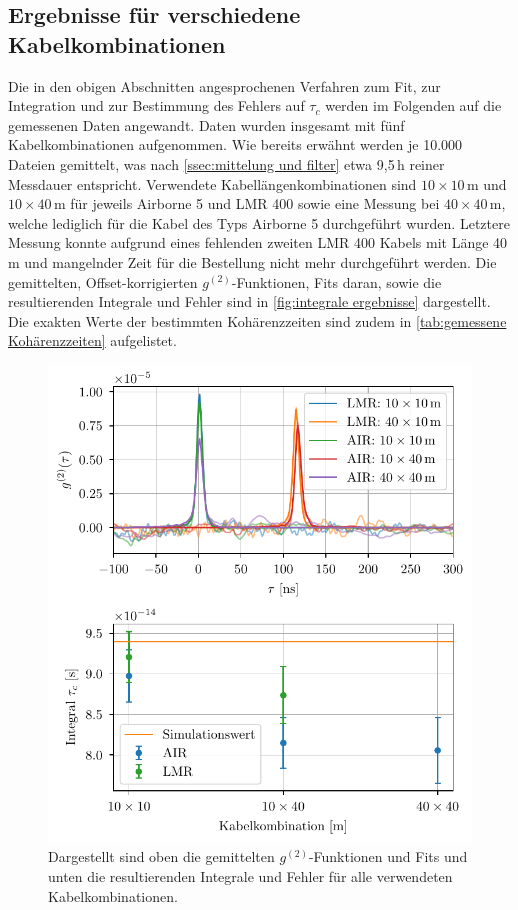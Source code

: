 \subsection{Ergebnisse für verschiedene Kabelkombinationen}
\label{ssec:Ergebnisse für verschiedene Kabelkombinationen}
Die in den obigen Abschnitten angesprochenen Verfahren zum Fit, zur Integration und zur Bestimmung des Fehlers auf $\tau_c$ werden im Folgenden auf die gemessenen Daten angewandt. 
Daten wurden insgesamt mit fünf Kabelkombinationen aufgenommen. 
Wie bereits erwähnt werden je 10{.}000 Dateien gemittelt, was nach \autoref{ssec:mittelung und filter} etwa 9{,}5\,h reiner Messdauer entspricht. 
Verwendete Kabellängenkombinationen sind $10\times 10\,\mathrm{m}$ und $10\times 40\,\mathrm{m}$ für jeweils Airborne 5 und LMR 400 sowie eine Messung bei $40\times 40\,\mathrm{m}$, welche lediglich für die Kabel des Typs Airborne 5 durchgeführt wurden. 
Letztere Messung konnte aufgrund eines fehlenden zweiten LMR 400 Kabels mit Länge 40\,m und mangelnder Zeit für die Bestellung nicht mehr durchgeführt werden. 
Die gemittelten, Offset-korrigierten $g^{(2)}$-Funktionen, Fits daran, sowie die resultierenden Integrale und Fehler sind in \autoref{fig:integrale ergebnisse} dargestellt. 
Die exakten Werte der bestimmten Kohärenzzeiten sind zudem in \autoref{tab:gemessene Kohärenzzeiten} aufgelistet. 
\begin{figure}[hp]
    \centering
    \includegraphics{images/Analysis/all_combined.pdf}
    \caption{Dargestellt sind oben die gemittelten $g^{(2)}$-Funktionen und Fits und unten die resultierenden Integrale und Fehler für alle verwendeten Kabelkombinationen.}
    \label{fig:integrale ergebnisse}
\end{figure}
